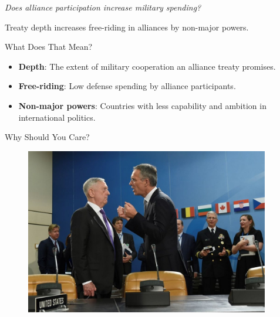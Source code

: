 \documentclass[12pt]{beamer}
\begin{document}

\begin{frame}[standout]

\huge \textit{Does alliance participation increase military spending?} 

\end{frame}

 \begin{frame}[standout]

Treaty depth increases free-riding in alliances by non-major powers.  

 \end{frame}
 
 
 \begin{frame}{What Does That Mean?} 

\begin{itemize}
\item \textbf{Depth}: The extent of military cooperation an alliance treaty promises.
\pause  
\item \textbf{Free-riding}: Low defense spending by alliance participants. 
\pause 
\item \textbf{Non-major powers}: Countries with less capability and ambition in international politics. 
\end{itemize}

 \end{frame}
 
 
 

\begin{frame}{Why Should You Care?}

\begin{figure}[htbp]
	\centering
		\includegraphics[width=0.95\textwidth]{mattis-nato.jpg}
	\label{fig:mattis-nato}
\end{figure}


\end{frame}
\end{document}

